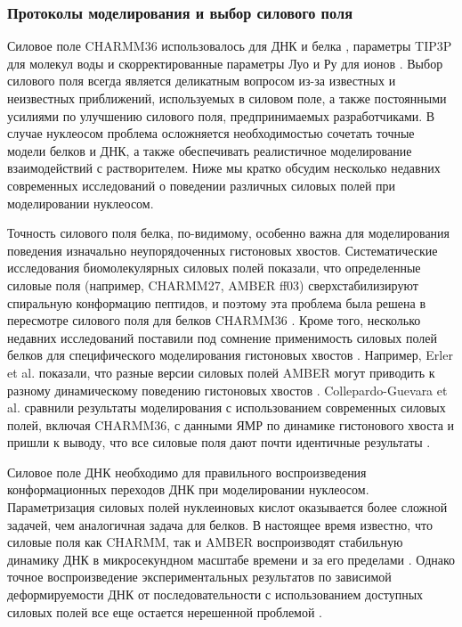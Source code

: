\subsubsection{Протоколы моделирования и выбор силового поля}
    Силовое поле CHARMM36 использовалось для ДНК и белка \cite{best_optimization_2012,hart_optimization_2012}, параметры TIP3P для молекул воды и скорректированные параметры  Луо и Ру для ионов \cite{luo_simulation_2010}. Выбор силового поля всегда является деликатным вопросом из-за известных и неизвестных приближений, используемых в силовом поле, а также постоянными усилиями по улучшению силового поля, предпринимаемых разработчиками. В случае нуклеосом проблема осложняется необходимостью сочетать точные модели белков и ДНК, а также обеспечивать реалистичное моделирование взаимодействий с растворителем. Ниже мы кратко обсудим несколько недавних современных исследований о поведении различных силовых полей при моделировании нуклеосом.
    
    Точность силового поля белка, по-видимому, особенно важна для моделирования поведения изначально неупорядоченных гистоновых хвостов. Систематические исследования биомолекулярных силовых полей \cite{lindorff-larsen_systematic_2012} показали, что определенные силовые поля (например, CHARMM27, AMBER ff03) сверхстабилизируют спиральную конформацию пептидов, и поэтому эта проблема была решена в пересмотре силового поля для белков CHARMM36 \cite{best_optimization_2012}. Кроме того, несколько недавних исследований поставили под сомнение применимость силовых полей белков для специфического моделирования гистоновых хвостов \cite{erler_role_2014,collepardo-guevara_chromatin_2015,potoyan_energy_2011}. Например, Erler et al. показали, что разные версии силовых полей AMBER могут приводить к разному динамическому поведению гистоновых хвостов \cite{erler_role_2014}. Collepardo-Guevara et al. сравнили результаты моделирования с использованием современных силовых полей, включая CHARMM36, с данными ЯМР по динамике гистонового хвоста и пришли к выводу, что все силовые поля дают почти идентичные результаты \cite{collepardo-guevara_chromatin_2015}.

    Силовое поле ДНК необходимо для правильного воспроизведения конформационных переходов ДНК при моделировании нуклеосом. Параметризация силовых полей нуклеиновых кислот оказывается более сложной задачей, чем аналогичная задача для белков. В настоящее время известно, что силовые поля как CHARMM, так и AMBER воспроизводят стабильную динамику ДНК в микросекундном масштабе времени и за его пределами \cite{galindo-murillo_convergence_2015}. Однако точное воспроизведение экспериментальных результатов по зависимой  деформируемости ДНК от последовательности с использованием доступных силовых полей все еще остается нерешенной проблемой \cite{perez_frontiers_2012}.
    

